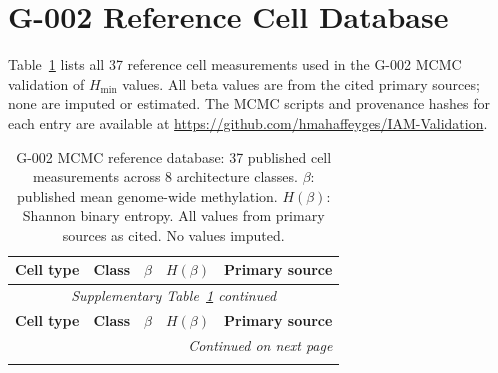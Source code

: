 \documentclass[12pt,a4paper]{article}
\newcommand{\Hmin}{H_{\min}}
\begin{document}
\section{G-002 Reference Cell Database}
\label{sec:supp_database}

Table~\ref{tab:database} lists all 37 reference cell measurements used in the
G-002 MCMC validation of $\Hmin$ values. All beta values are from the cited
primary sources; none are imputed or estimated. The MCMC scripts and provenance
hashes for each entry are available at
\url{https://github.com/hmahaffeyges/IAM-Validation}.

\begin{longtable}{p{4.2cm}p{2.0cm}p{1.0cm}p{1.0cm}p{5.5cm}}
\caption{G-002 MCMC reference database: 37 published cell measurements across
8 architecture classes. $\beta$: published mean genome-wide methylation.
$H(\beta)$: Shannon binary entropy. All values from primary sources as cited.
No values imputed.}
\label{tab:database}\\
\toprule
\textbf{Cell type} & \textbf{Class} & \textbf{$\beta$} & \textbf{$H(\beta)$} & \textbf{Primary source} \\
\midrule
\endfirsthead
\multicolumn{5}{c}{\small\itshape Supplementary Table~\ref{tab:database} continued}\\
\toprule
\textbf{Cell type} & \textbf{Class} & \textbf{$\beta$} & \textbf{$H(\beta)$} & \textbf{Primary source} \\
\midrule
\endhead
\midrule\multicolumn{5}{r}{\small\itshape Continued on next page}\\
\endfoot
\bottomrule
\endlastfoot


\end{longtable}
\end{document}
